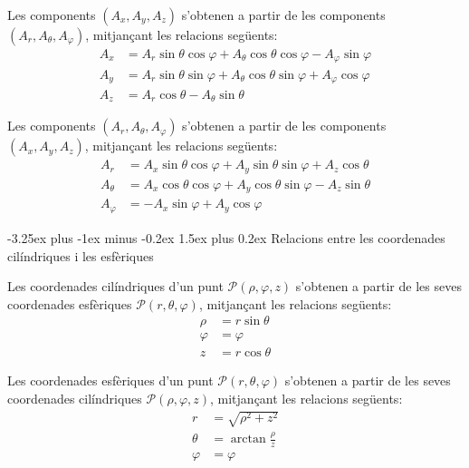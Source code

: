 \documentclass[catalan,a4paper,twoside,11pt]{article}
\makeatletter
\renewcommand{\subsection}{\@startsection {subsection}{2}{0pt}%
	{-3.25ex plus -1ex minus -0.2ex}%
	{1.5ex plus 0.2ex}%
	{\large  \sffamily  \bfseries}}
\makeatother
\begin{document}
Les components  $(A_x, A_y, A_z)$ s'obtenen a partir de les  components  $(A_r, A_\theta, A_\varphi)$, mitjançant les relacions següents:
\begin{subequations}\begin{align}
    A_x &= A_r\sin\theta\cos\varphi+A_\theta\cos\theta\cos\varphi-A_\varphi\sin\varphi \\
    A_y &= A_r\sin\theta\sin\varphi+A_\theta\cos\theta\sin\varphi+A_\varphi\cos\varphi\\
    A_z &= A_r\cos\theta-A_\theta\sin\theta
\end{align}\end{subequations}

Les components  $(A_r, A_\theta, A_\varphi)$ s'obtenen a partir de les  components  $(A_x, A_y, A_z)$, mitjançant les relacions següents:
\begin{subequations}\begin{align}
    A_r &=  A_x\sin\theta\cos\varphi+A_y\sin\theta\sin\varphi+A_z\cos\theta\\
    A_\theta &=  A_x\cos\theta\cos\varphi+A_y\cos\theta\sin\varphi-A_z\sin\theta\\
    A_\varphi &= -A_x\sin\varphi+A_y\cos\varphi
\end{align}\end{subequations}


\subsection{Relacions entre les coordenades cilíndriques i les esfèriques}

Les coordenades cilíndriques  d'un punt $\mathscr{P}(\rho,\varphi,z)$
s'obtenen a partir de les seves coordenades esfèriques
$\mathscr{P}(r,\theta,\varphi)$, mitjançant les relacions següents:
\begin{subequations}\begin{align}
    \rho &=r\sin\theta \\ \varphi &=\varphi \\z &=r\cos\theta
\end{align}\end{subequations}

Les coordenades  esfèriques  d'un punt $\mathscr{P}(r,\theta,\varphi)$
s'obtenen a partir de les seves coordenades cilíndriques
$\mathscr{P}(\rho,\varphi,z)$, mitjançant les relacions següents:
\begin{subequations}\begin{align}
    r &=\sqrt{\rho^2+z^2}\\
    \theta &=\arctan\frac{\rho}{z}\\
    \varphi &=\varphi
\end{align}\end{subequations}
\end{document}
